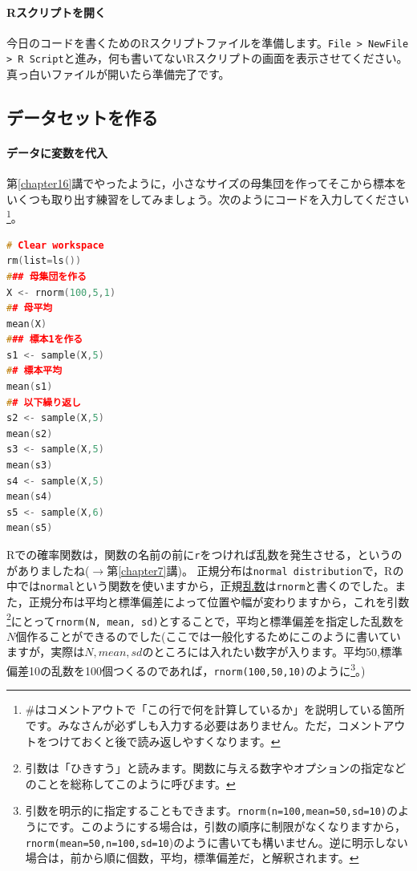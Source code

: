 \documentclass{ltjsbook}
\begin{document}
\paragraph{Rスクリプトを開く}今日のコードを書くためのRスクリプトファイルを準備します。\verb|File > NewFile > R Script|と進み，何も書いてないRスクリプトの画面を表示させてください。真っ白いファイルが開いたら準備完了です。

\subsection{データセットを作る}
\paragraph{データに変数を代入}
第\ref{chapter16}講でやったように，小さなサイズの母集団を作ってそこから標本をいくつも取り出す練習をしてみましょう。次のようにコードを入力してください\footnote{\#はコメントアウトで「この行で何を計算しているか」を説明している箇所です。みなさんが必ずしも入力する必要はありません。ただ，コメントアウトをつけておくと後で読み返しやすくなります。}。

\begin{lstlisting}[language=c++]
# Clear workspace
rm(list=ls())
### 母集団を作る
X <- rnorm(100,5,1)
## 母平均
mean(X)
### 標本1を作る
s1 <- sample(X,5)
## 標本平均
mean(s1)
## 以下繰り返し
s2 <- sample(X,5)
mean(s2)
s3 <- sample(X,5)
mean(s3)
s4 <- sample(X,5)
mean(s4)
s5 <- sample(X,6)
mean(s5)
\end{lstlisting}

Rでの確率関数は，関数の名前の前に\texttt{r}をつければ乱数を発生させる，というのがありましたね($\to$第\ref{chapter7}講)。
正規分布は\verb|normal distribution|で，Rの中では\texttt{normal}という関数を使いますから，正規\underline{乱数}は\texttt{rnorm}と書くのでした。また，正規分布は平均と標準偏差によって位置や幅が変わりますから，これを引数\footnote{引数は「ひきすう」と読みます。関数に与える数字やオプションの指定などのことを総称してこのように呼びます。}にとって\texttt{rnorm(N, mean, sd)}とすることで，平均と標準偏差を指定した乱数を$N$個作ることができるのでした(ここでは一般化するためにこのように書いていますが，実際は$N,mean,sd$のところには入れたい数字が入ります。平均50,標準偏差10の乱数を100個つくるのであれば，\texttt{rnorm(100,50,10)}のように\footnote{引数を明示的に指定することもできます。\texttt{rnorm(n=100,mean=50,sd=10)}のようにです。このようにする場合は，引数の順序に制限がなくなりますから，\texttt{rnorm(mean=50,n=100,sd=10})のように書いても構いません。逆に明示しない場合は，前から順に個数，平均，標準偏差だ，と解釈されます。}。)
\end{document}
